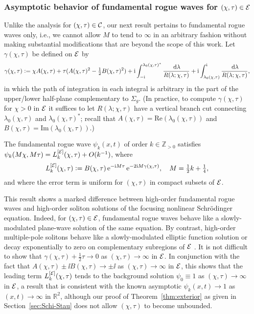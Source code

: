 \subsubsection{Asymptotic behavior of fundamental rogue waves for $(\chi,\tau)\in\mathcal{E}$}
\label{sec:Results-Exterior}
Unlike the analysis for $(\chi,\tau)\in\mathcal{C}$, our next result pertains to fundamental rogue waves only, i.e., we cannot allow $M$ to tend to $\infty$ in an arbitrary fashion without making substantial modifications that are beyond the scope of this work.  Let $\gamma(\chi,\tau)$ be defined on $\mathcal{E}$ by
\begin{equation}
\gamma(\chi,\tau)\vcentcolon= \chi A(\chi,\tau)+\tau(A(\chi,\tau)^2-\tfrac{1}{2}B(\chi,\tau)^2)+\mathrm{i}\int_{-\mathrm{i}}^{\lambda_0(\chi,\tau)^*}\frac{\,\mathrm{d}\lambda}{R(\lambda;\chi,\tau)}+\mathrm{i}\int_{\lambda_0(\chi,\tau)}^{\mathrm{i}}
\frac{\,\mathrm{d}\lambda}{R(\lambda;\chi,\tau)},
\label{eq:gamma-formula-intro}
\end{equation}
in which the path of integration in each integral is arbitrary in the part of the upper/lower half-plane complementary to $\Sigma_g$.  (In practice, to compute $\gamma(\chi,\tau)$ for $\chi>0$ in $\mathcal{E}$ it suffices to let $R(\lambda;\chi,\tau)$ have a vertical branch cut connecting $\lambda_0(\chi,\tau)$ and $\lambda_0(\chi,\tau)^*$; recall that $A(\chi,\tau)=\mathrm{Re}(\lambda_0(\chi,\tau))$ and $B(\chi,\tau)=\mathrm{Im}(\lambda_0(\chi,\tau))$.)  
\begin{theorem}
The fundamental rogue wave $\psi_k(x,t)$ of order $k\in\mathbb{Z}_{>0}$ satisfies $\psi_k(M\chi,M\tau)=L_k^{[\mathcal{E}]}(\chi,\tau)+O(k^{-1})$, where
\begin{equation}
L_k^{[\mathcal{E}]}(\chi,\tau)\vcentcolon= B(\chi,\tau)\,\mathrm{e}^{-\mathrm{i} M\tau}\,\mathrm{e}^{-2\mathrm{i} M\gamma(\chi,\tau)},\quad M=\tfrac{1}{2}k+\tfrac{1}{4},
\label{eq:leading-term-exterior}
\end{equation}
and where the error term is uniform for $(\chi,\tau)$ in compact subsets of $\mathcal{E}$.
\label{thm:exterior}
\end{theorem}
This result shows a marked difference between high-order fundamental rogue waves and high-order soliton solutions of the focusing nonlinear Schr\"odinger equation.  Indeed, for $(\chi,\tau)\in\mathcal{E}$, fundamental rogue waves behave like a slowly-modulated plane-wave solution of the same equation.  By contrast, high-order multiple-pole solitons behave like a slowly-modulated elliptic function solution or decay exponentially to zero on complementary subregions of $\mathcal{E}$ \cite{BilmanBW19}. It is not difficult to show that $\gamma(\chi,\tau)+\tfrac{1}{2}\tau\to 0$ as $(\chi,\tau)\to\infty$ in $\mathcal{E}$.  In conjunction with the fact that $A(\chi,\tau)\pm\ii B(\chi,\tau)\to \pm\ii$ as $(\chi,\tau)\to\infty$ in $\mathcal{E}$, this shows that the leading term $L_k^{[\mathcal{E}]}(\chi,\tau)$ tends to the background solution $\psi_0\equiv 1$ as $(\chi,\tau)\to\infty$ in $\mathcal{E}$, a result that is consistent with the known asymptotic $\psi_k(x,t)\to 1$ as $(x,t)\to\infty$ in $\mathbb{R}^2$, although our proof of Theorem~\ref{thm:exterior} as given in Section~\ref{sec:Schi-Stau} does not allow $(\chi,\tau)$ to become unbounded.  

